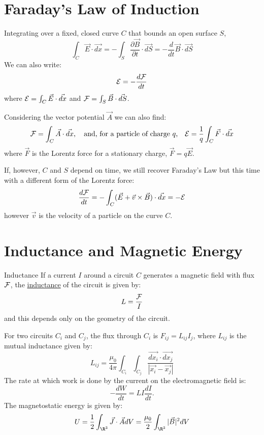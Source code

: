 \documentclass[../Main.tex]{subfiles}
\begin{document}
\section{Faraday's Law of Induction}
Integrating  over a fixed, closed curve $C$ that bounds an open surface $S$,
\begin{equation*}
    \int_C \vec{E} \cdot \vec{dx} = - \int_S \frac{\partial \vec{B}}{\partial t} \cdot \vec{dS} = -\frac{d}{dt} \vec{B} \cdot \vec{dS}
\end{equation*}
We can also write:
\begin{equation*}
    \mathcal{E} = -\frac{d\mathcal{F}}{dt}
\end{equation*}
where $\mathcal{E} = \int_C \vec{E} \cdot \vec{dx}$ and $\mathcal{F} = \int_S \vec{B} \cdot \vec{dS}$.

Considering the vector potential $\vec{A}$ we can also find:
\begin{equation*}
    \mathcal{F} = \int_C \vec{A} \cdot \vec{dx},\quad\text{and, for a particle of charge $q$,}\quad\mathcal{E} = \frac1q\int_C \vec{F} \cdot \vec{dx}
\end{equation*}
where $\vec{F}$ is the Lorentz force for a stationary charge, $\vec{F} = q\vec{E}$.

If, however, $C$ and $S$ depend on time, we still recover Faraday's Law but this time with a different form of the Lorentz force:
\begin{equation*}
    \frac{d\mathcal{F}}{dt} = -\int_C (\vec{E} + \vec{v} \times \vec{B}) \cdot \vec{dx} = -\mathcal{E}
\end{equation*}
however $\vec{v}$ is the velocity of a particle on the curve $C$.
\section{Inductance and Magnetic Energy}
\begin{definition}{Inductance}
    If a current $I$ around a circuit $C$ generates a magnetic field with flux $\mathcal{F}$, the \underline{inductance} of the circuit is given by:
    \begin{equation*}
        L = \frac{\mathcal{F}}{I}
    \end{equation*}
    and this depends only on the geometry of the circuit.
\end{definition}
For two circuits $C_i$ and $C_j$, the flux through $C_i$ is $F_{ij} = L_{ij} I_j$, where $L_{ij}$ is the mutual inductance given by:
\begin{equation*}
    L_{ij} = \frac{\mu_0}{4\pi} \int_{C_i} \int_{C_j} \frac{\vec{dx_i} \cdot \vec{dx_j}}{|\vec{x_{i}} - \vec{x_{j}}|}
\end{equation*}
The rate at which work is done by the current on the electromagnetic field is:
\begin{equation*}
    -\frac{dW}{dt} = LI \frac{dI}{dt}.
\end{equation*}
The magnetostatic energy is given by:
\begin{equation*}
    U = \frac12 \int_{\R^3} \vec{J} \cdot \vec{A} dV = \frac{\mu_0}{2} \int_{\R^3} |\vec{B}|^2dV
\end{equation*}
\end{document}
